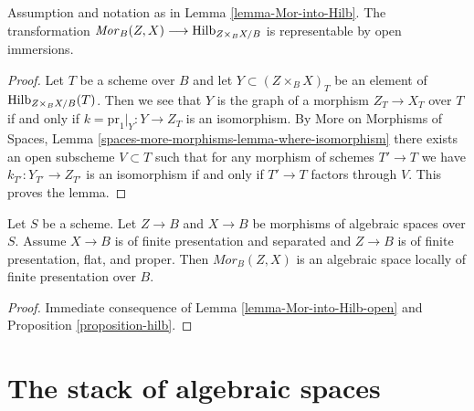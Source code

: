 \begin{lemma}
\label{lemma-Mor-into-Hilb-open}
Assumption and notation as in Lemma \ref{lemma-Mor-into-Hilb}.
The transformation
$\mathit{Mor}_B(Z, X) \longrightarrow \mathrm{Hilb}_{Z \times_B X/B}$
is representable by open immersions.
\end{lemma}

\begin{proof}
Let $T$ be a scheme over $B$ and let $Y \subset (Z \times_B X)_T$
be an element of $\mathrm{Hilb}_{Z \times_B X/B}(T)$. Then we see that
$Y$ is the graph of a morphism $Z_T \to X_T$ over $T$ if and only
if $k = \text{pr}_1|_Y : Y \to Z_T$ is an isomorphism. By
More on Morphisms of Spaces, Lemma
\ref{spaces-more-morphisms-lemma-where-isomorphism}
there exists an open subscheme $V \subset T$ such that
for any morphism of schemes $T' \to T$ we have
$k_{T'} : Y_{T'} \to Z_{T'}$ is an isomorphism if and
only if $T' \to T$ factors through $V$.
This proves the lemma.
\end{proof}

\begin{proposition}
\label{proposition-Mor}
Let $S$ be a scheme. Let $Z \to B$ and $X \to B$ be morphisms of algebraic
spaces over $S$. Assume $X \to B$ is of finite presentation and separated and
$Z \to B$ is of finite presentation, flat, and proper. Then
$\mathit{Mor}_B(Z, X)$ is an algebraic space locally of finite
presentation over $B$.
\end{proposition}

\begin{proof}
Immediate consequence of
Lemma \ref{lemma-Mor-into-Hilb-open}
and Proposition \ref{proposition-hilb}.
\end{proof}








\section{The stack of algebraic spaces}
\label{section-stack-of-spaces}


